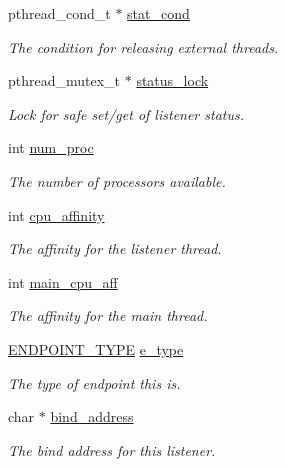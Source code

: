 \begin{DoxyCompactItemize}
pthread\-\_\-cond\-\_\-t $\ast$ \hyperlink{structtb__listener__t_a7f764a9f865a1a752a852d4d4422023a}{stat\-\_\-cond}
\begin{DoxyCompactList}\small\item\em The condition for releasing external threads. \end{DoxyCompactList}\item 
pthread\-\_\-mutex\-\_\-t $\ast$ \hyperlink{structtb__listener__t_a54cc7a2ff1d7592de7c4647c6fd66e14}{status\-\_\-lock}
\begin{DoxyCompactList}\small\item\em Lock for safe set/get of listener status. \end{DoxyCompactList}\item 
int \hyperlink{structtb__listener__t_ae9a3e84ebf05ae6b7baf872b844c94ea}{num\-\_\-proc}
\begin{DoxyCompactList}\small\item\em The number of processors available. \end{DoxyCompactList}\item 
int \hyperlink{structtb__listener__t_ab7a892d2900125821f3d6b11d003191b}{cpu\-\_\-affinity}
\begin{DoxyCompactList}\small\item\em The affinity for the listener thread. \end{DoxyCompactList}\item 
int \hyperlink{structtb__listener__t_a2715f812fc8239e875c5e9413f8ed04b}{main\-\_\-cpu\-\_\-aff}
\begin{DoxyCompactList}\small\item\em The affinity for the main thread. \end{DoxyCompactList}\item 
\hyperlink{tb__listener_8h_ae37f3ebcf0081b2dd11adf41f1f867d6}{E\-N\-D\-P\-O\-I\-N\-T\-\_\-\-T\-Y\-P\-E} \hyperlink{structtb__listener__t_abbd1eee27b1b57dcb1f57b2ef4b4fa12}{e\-\_\-type}
\begin{DoxyCompactList}\small\item\em The type of endpoint this is. \end{DoxyCompactList}\item 
char $\ast$ \hyperlink{structtb__listener__t_ae15b37b2cdfd51bbb2719e4eb3ffb917}{bind\-\_\-address}
\begin{DoxyCompactList}\small\item\em The bind address for this listener. \end{DoxyCompactList}\item 

\end{DoxyCompactItemize}
